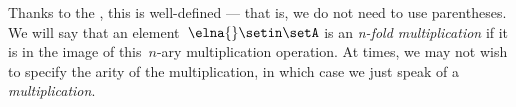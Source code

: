 
Thanks to the , this is well-defined — that is, we do not need to use parentheses.
We will say that an element~$\elna{} \setin \setA$ is an \emph{n-fold multiplication} if it is in the image of this~$n$-ary multiplication operation.
At times, we may not wish to specify the arity of the multiplication, in which case we just speak of a \emph{multiplication}.
